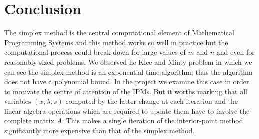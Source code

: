 \documentclass[a4paper,10 pt,titlepage,twoside]{book}
\theoremstyle{plain}
\theoremstyle{definition}
\theoremstyle{remark}
\begin{document}
{{\chapter{Conclusion}
The simplex method is the central computational element of Mathematical Programming Systems and this method works so well in practice but the computational process could break down for large values of $m$ and $n$ and even for reasonably sized problems.
We observed he Klee and Minty problem in which we can see the simplex method is an exponential-time algorithm; thus the algorithm does not have a polynomial bound. In the project we examine this case in order to motivate the centre of attention of the IPMs.
But it worths marking that all variables $(x, \lambda, s)$ computed by the latter change at each iteration and the linear algebra operations which are required to update them have to involve the complete matrix $A$. This makes a single iteration of the interior-point method significantly more expensive than that of the simplex method.\\

}}
\end{document}
